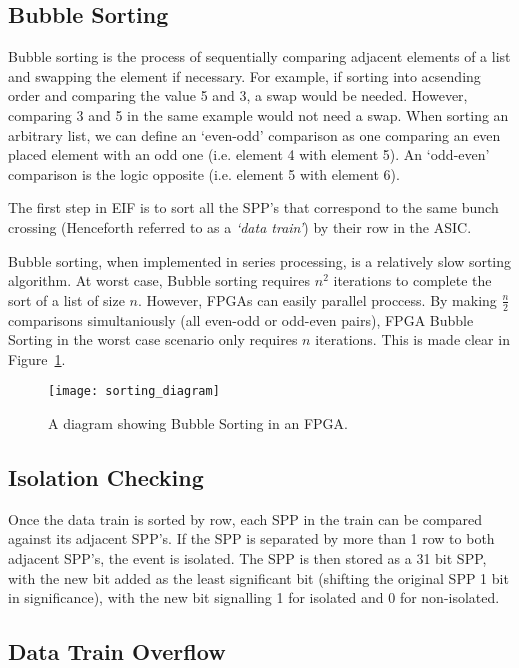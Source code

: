	\subsection{Bubble Sorting}

		Bubble sorting is the process of sequentially comparing adjacent elements of a list and swapping the element if necessary.
		For example, if sorting into acsending order and comparing the value 5 and 3, a swap would be needed.
		However, comparing 3 and 5 in the same example would not need a swap.
		When sorting an arbitrary list, we can define an `even-odd' comparison as one comparing an even placed element with an odd one (i.e. element 4 with element 5).
		An `odd-even' comparison is the logic opposite (i.e. element 5 with element 6).
		\par
		The first step in EIF is to sort all the SPP's that correspond to the same bunch crossing (Henceforth referred to as a \textit{`data train'}) by their row in the ASIC.
		\par
		Bubble sorting, when implemented in series processing, is a relatively slow sorting algorithm.
		At worst case, Bubble sorting requires $n^2$ iterations to complete the sort of a list of size $n$.
		However, FPGAs can easily parallel proccess.
		By making $\frac{n}{2}$ comparisons simultaniously (all even-odd or odd-even pairs), FPGA Bubble Sorting in the worst case scenario only requires $n$ iterations. This is made clear in Figure~\ref{fig:sorting}.

		\begin{figure}[ht]
			\centering
			\texttt{[image: sorting\_diagram]}
			\caption{A diagram showing Bubble Sorting in an FPGA.}
			\label{fig:sorting}
		\end{figure}

	\subsection{Isolation Checking}

		Once the data train is sorted by row, each SPP in the train can be compared against its adjacent SPP's.
		If the SPP is separated by more than 1 row to both adjacent SPP's, the event is isolated.
		The SPP is then stored as a 31 bit SPP, with the new bit added as the least significant bit (shifting the original SPP 1 bit in significance), with the new bit signalling 1 for isolated and 0 for non-isolated. 

	\subsection{Data Train Overflow} %
	\label{sub:data_train_overflow}
		
